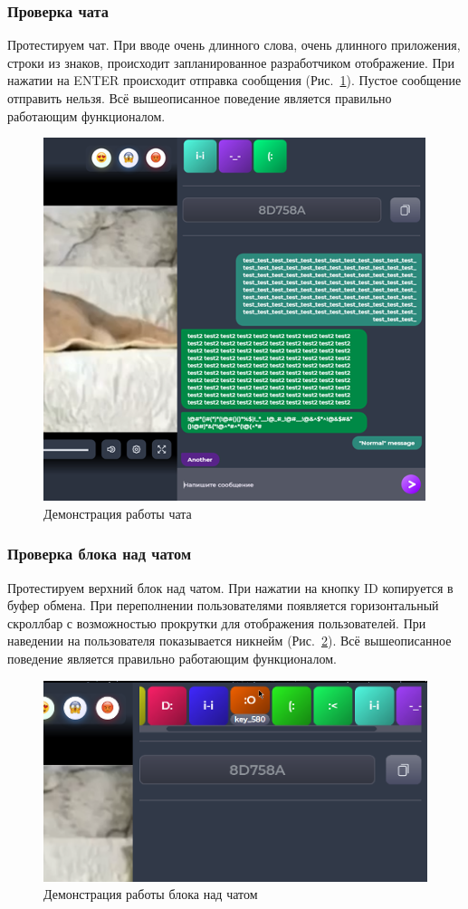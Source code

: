 \documentclass{../../includes/TechDocMultiAuthors}
\begin{document}
    \subsubsection{Проверка чата}

    Протестируем чат.
    При вводе очень длинного слова, очень длинного приложения, строки из знаков, происходит запланированное разработчиком отображение.
    При нажатии на ENTER происходит отправка сообщения (Рис.~\ref{fig:chat_big_text}).
    Пустое сообщение отправить нельзя.
    Всё вышеописанное поведение является правильно работающим функционалом.

    \begin{figure}[H]
        \centering
        \includegraphics[width=0.6\linewidth]{../images/chat_big_text.png}
        \caption{Демонстрация работы чата}
        \label{fig:chat_big_text}
    \end{figure}

    \subsubsection{Проверка блока над чатом}

    Протестируем верхний блок над чатом.
    При нажатии на кнопку ID копируется в буфер обмена.
    При переполнении пользователями появляется горизонтальный скроллбар с возможностью прокрутки для отображения пользователей.
    При наведении на пользователя показывается никнейм (Рис.~\ref{fig:block_users}).
    Всё вышеописанное поведение является правильно работающим функционалом.

    \begin{figure}[H]
        \centering
        \includegraphics[width=0.6\linewidth]{../images/block_users.png}
        \caption{Демонстрация работы блока над чатом}
        \label{fig:block_users}
    \end{figure}
\end{document}
